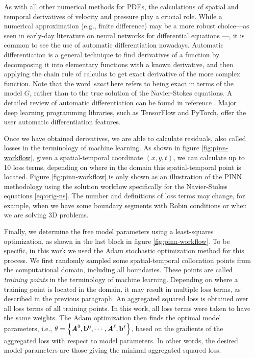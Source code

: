 As with all other numerical methods for PDEs, the calculations of spatial and temporal derivatives of velocity and pressure play a crucial role.
While a numerical approximation (e.g., finite difference) may be a more robust choice---as seen in early-day literature on neural networks for differential equations \cite{dissanayake_neural-network-based_1994,lagaris_artificial_1998}---, it is common to see the use of automatic differentiation nowadays.
Automatic differentiation is a general technique to find derivatives of a function by decomposing it into elementary functions with a known derivative, and then applying the chain rule of calculus to get exact derivative of the more complex function.
Note that the word {\it exact} here refers to being exact in terms of the model $G$, rather than to the true solution of the Navier-Stokes equations. 
A detailed review of automatic differentiation can be found in reference \cite{griewank_automatic_1988}.
Major deep learning programming libraries, such as TensorFlow and PyTorch, offer the user automatic differentiation features.

Once we have obtained derivatives, we are able to calculate residuals, also called losses in the terminology of machine learning.
As shown in figure \ref{fig:pinn-workflow}, given a spatial-temporal coordinate $(x, y, t)$, we can calculate up to \num{10} loss terms, depending on where in the domain this spatial-temporal point is located. 
Figure \ref{fig:pinn-workflow} is only shown as an illustration of the PINN methodology using the solution workflow specifically for the Navier-Stokes equations \eqref{eq:orig-ns}.
The number and definitions of loss terms may change, for example, when we have some boundary segments with Robin conditions or when we are solving 3D problems.

Finally, we determine the free model parameters using a least-squares optimization, as shown in the last block in figure \ref{fig:pinn-workflow}.
To be specific, in this work we used the Adam stochastic optimization method for this process. 
We first randomly sampled some spatial-temporal collocation points from the computational domain, including all boundaries.
These points are called {\it training points} in the terminology of machine learning.
Depending on where a training point is located in the domain, it may result in multiple loss terms, as described in the previous paragraph.
An aggregated squared loss is obtained over all loss terms of all training points.
In this work, all loss terms were taken to have the same weights.
The Adam optimization then finds the optimal model parameters, i.e., $\theta=\left\{\boldsymbol{\mathit{A}}^0, \mathbf{b}^0, \cdots, \boldsymbol{\mathit{A}}^\ell, \mathbf{b}^\ell\right\}$, based on the gradients of the aggregated loss with respect to model parameters.
In other words, the desired model parameters are those giving the minimal aggregated squared loss.

